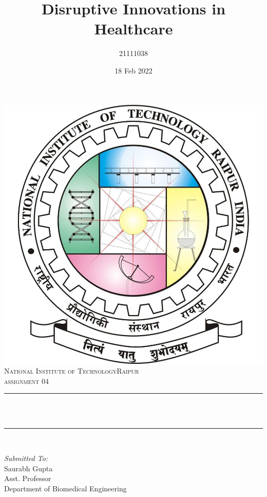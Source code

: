 \documentclass[12pt]{article}
\title{Disruptive Innovations in Healthcare}								%
\author{21111038}								%
\date{18 Feb 2022}											%
\makeatletter
\let\thetitle\@title
\makeatother
\begin{document}

\begin{titlepage}
	\centering
    \vspace*{0.5 cm}
    \includegraphics[scale = 0.10]{logo.jpg}\\[1.0 cm]	%
    \textsc{\LARGE  National Institute of Technology\newline\newline Raipur}\\[2.0 cm]	%
	\textsc{\Large assignment 04}\\[0.5 cm]				%
	\rule{\linewidth}{0.2 mm} \\[0.4 cm]
	{ \huge \bfseries \thetitle}\\
	\rule{\linewidth}{0.2 mm} \\[1.5 cm]
	
	\begin{minipage}{0.4\textwidth}
		\begin{flushleft} \large
			\emph{Submitted To:}\\
			Saurabh Gupta\\
            Asst. Professor\\
            Department of Biomedical Engineering\\
			\end{flushleft}
			\end{minipage}~
			\begin{minipage}{0.4\textwidth}
            

\end{minipage}
\end{titlepage}
\end{document}
